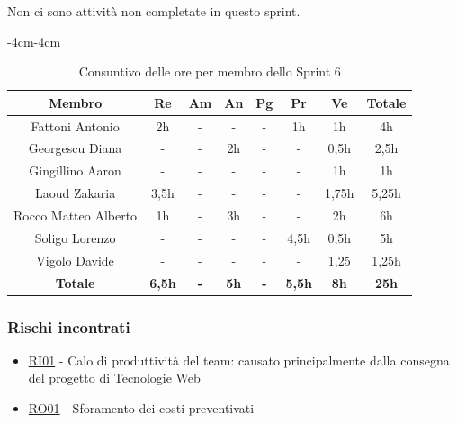 \documentclass[a4paper,12pt]{article}
\begin{document}
Non ci sono attività non completate in questo sprint.

\begin{table}[H]
    \begin{adjustwidth}{-4cm}{-4cm}
    \centering
    \begin{tabular}{|c|c|c|c|c|c|c|c|}
        \hline
        \textbf{Membro}& \textbf{Re} & \textbf{Am} & \textbf{An} & \textbf{Pg} & \textbf{Pr} & \textbf{Ve} & \textbf{Totale} \\
        \hline
        Fattoni Antonio & 2h & - & - & - & 1h & 1h & 4h \\
        \hline
        Georgescu Diana & - & - & 2h & - & - & 0,5h & 2,5h \\
        \hline
        Gingillino Aaron & - & - & - & - & - & 1h & 1h \\
        \hline
        Laoud Zakaria & 3,5h & - & - & - & - & 1,75h & 5,25h \\
        \hline
        Rocco Matteo Alberto & 1h & - & 3h & - & - & 2h & 6h \\
        \hline
        Soligo Lorenzo & - & - & - & - & 4,5h & 0,5h & 5h \\
        \hline
        Vigolo Davide & - & - & - & - & - & 1,25 & 1,25h \\
        \hline
        \textbf{Totale} & \textbf{6,5h} & \textbf{-} & \textbf{5h} & \textbf{-} & \textbf{5,5h} & \textbf{8h} & \textbf{25h} \\
        \hline
    \end{tabular}
    \caption{Consuntivo delle ore per membro dello Sprint 6}
    \end{adjustwidth}
\end{table}

\subsubsection{Rischi incontrati}
\begin{itemize}
    \item \hyperref[RI01]{RI01} - Calo di produttività del team: causato principalmente dalla consegna del progetto di Tecnologie Web
    \item \hyperref[RO01]{RO01} - Sforamento dei costi preventivati
\end{itemize}
\end{document}
